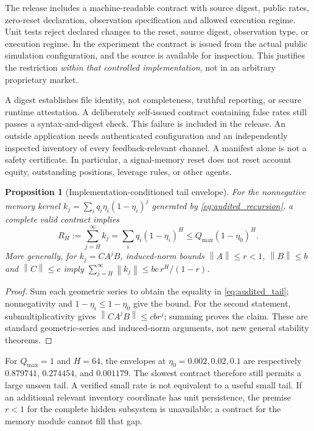\documentclass[10pt,twocolumn,letterpaper]{article}
\newtheorem{proposition}[theorem]{Proposition}
\theoremstyle{definition}
\theoremstyle{remark}
\newcommand{\norm}[1]{\left\lVert #1\right\rVert}
\begin{document}
The release includes a machine-readable contract with source digest, public rates, zero-reset declaration, observation specification and allowed execution regime. Unit tests reject declared changes to the reset, source digest, observation type, or execution regime. In the experiment the contract is issued from the actual public simulation configuration, and the source is available for inspection. This justifies the restriction \emph{within that controlled implementation}, not in an arbitrary proprietary market.

A digest establishes file identity, not completeness, truthful reporting, or secure runtime attestation. A deliberately self-issued contract containing false rates still passes a syntax-and-digest check. This failure is included in the release. An outside application needs authenticated configuration and an independently inspected inventory of every feedback-relevant channel. A manifest alone is not a safety certificate. In particular, a signal-memory reset does not reset account equity, outstanding positions, leverage rules, or other agents.

\begin{proposition}[Implementation-conditioned tail envelope]
\label{prop:audited_tail}
For the nonnegative memory kernel $k_j=\sum_iq_i\eta_i(1-\eta_i)^j$ generated by \cref{eq:audited_recursion}, a complete valid contract implies
\begin{equation}
 R_H:=\sum_{j=H}^{\infty}k_j
 =\sum_iq_i(1-\eta_i)^H
 \le Q_{\max}(1-\eta_0)^H.
 \label{eq:audited_tail}
\end{equation}
More generally, for $k_j=CA^jB$, induced-norm bounds $\norm{A}\le r<1$, $\norm{B}\le b$ and $\norm{C}\le c$ imply
$\sum_{j=H}^{\infty}\norm{k_j}\le bc\,r^H/(1-r)$.
\end{proposition}
\begin{proof}
Sum each geometric series to obtain the equality in \cref{eq:audited_tail}; nonnegativity and $1-\eta_i\le1-\eta_0$ give the bound. For the second statement, submultiplicativity gives $\norm{CA^jB}\le cb r^j$; summing proves the claim. These are standard geometric-series and induced-norm arguments, not new general stability theorems.
\end{proof}

For $Q_{\max}=1$ and $H=64$, the envelopes at $\eta_0=0.002,0.02,0.1$ are respectively $0.879741$, $0.274454$, and $0.001179$. The slowest contract therefore still permits a large unseen tail. A verified small rate is not equivalent to a useful small tail. If an additional relevant inventory coordinate has unit persistence, the premise $r<1$ for the complete hidden subsystem is unavailable; a contract for the memory module cannot fill that gap.
\end{document}
